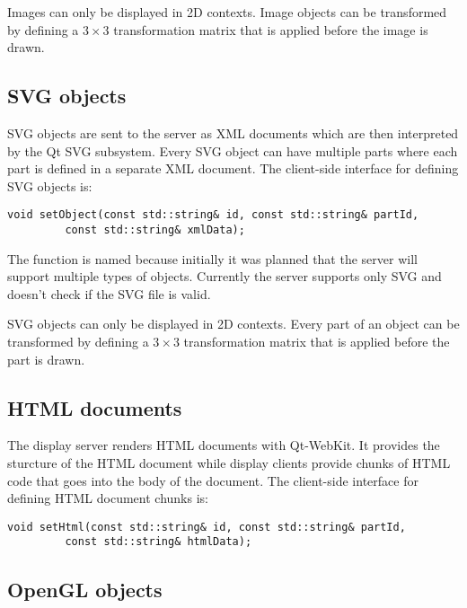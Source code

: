 Images can only be displayed in 2D contexts. Image objects can be transformed
by defining a $3 \times 3$ transformation matrix that is applied before
the image is drawn.

\subsection{SVG objects}

SVG objects are sent to the server as XML documents which are then interpreted
by the Qt SVG subsystem. Every SVG object can have multiple parts where each
part is defined in a separate XML document.
The client-side interface for defining SVG objects is:

\begin{Verbatim}[fontsize=\scriptsize,gobble=3]
   void setObject(const std::string& id, const std::string& partId,
         const std::string& xmlData); 
\end{Verbatim}

The function is named  because initially it was planned that
the server will support multiple types of objects. Currently the server
supports only SVG and doesn't check if the SVG file is valid.

SVG objects can only be displayed in 2D contexts. Every part of an object can
be transformed by defining a $3 \times 3$ transformation matrix that is applied
before the part is drawn.

\subsection{HTML documents}

The display server renders HTML documents with Qt-WebKit. It provides the
sturcture of the HTML document while display clients provide chunks of
HTML code that goes into the body of the document.
The client-side interface for defining HTML document chunks is:

\begin{Verbatim}[fontsize=\scriptsize,gobble=3]
   void setHtml(const std::string& id, const std::string& partId,
         const std::string& htmlData); 
\end{Verbatim}


\subsection{OpenGL objects}

